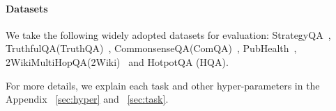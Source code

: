 \paragraph{Datasets}
We take the following widely adopted datasets for evaluation: StrategyQA~\cite{geva2021did}, TruthfulQA(TruthQA)~\cite{lin2021truthfulqa}, CommonsenseQA(ComQA)~\cite{talmor2018commonsenseqa}, PubHealth~\cite{zhang2023interpretable}, 2WikiMultiHopQA(2Wiki)~\cite{ho2020constructing} and HotpotQA (HQA)\cite{yang2018hotpotqa}. 

For more details, we explain each task and other hyper-parameters in the Appendix ~\ref{sec:hyper} and ~\ref{sec:task}.


\begin{table*}[t]
    \centering
    \begin{minipage}{0.48\textwidth}
        \centering
\end{minipage}
\end{table*}
